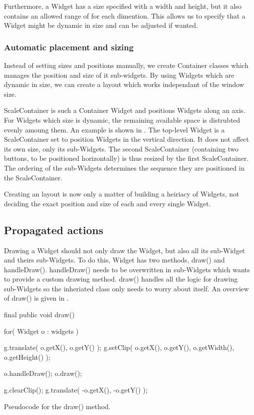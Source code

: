 Furthermore, a Widget has a size specified with a width and height, but it also contains an allowed range of for each dimention. This allows us to specify that a Widget might be dynamic in size and can be adjusted if wanted.


\subsubsection{Automatic placement and sizing}

Instead of setting sizes and positions manually, we create Container classes which manages the position and size of it sub-widgets. By using Widgets which are dynamic in size, we can create a layout which works independant of the window size.

ScaleContainer is such a Container Widget and positions Widgets along an axis. For Widgets which size is dynamic, the remaining available space is distrubted evenly amoung them. An example is shown in . The top-level Widget is a ScaleContainer set to position Widgets in the vertical direction. It does not affect its own size, only its sub-Widgets. The second ScaleContainer (containing two buttons, to be positioned horizontally) is thus resized by the first ScaleContainer. The ordering of the sub-Widgets determines the sequence they are positioned in the ScaleContainer.


Creating an layout is now only a matter of building a heiriacy of Widgets, not deciding the exact position and size of each and every single Widget.


\subsection{Propagated actions}

Drawing a Widget should not only draw the Widget, but also all its sub-Widget and theirs sub-Widgets. To do this, Widget has two methods, draw() and handleDraw(). handleDraw() needs to be overwritten in sub-Widgets which wants to provide a custom drawing method. draw() handles all the logic for drawing sub-Widgets so the inheriated class only needs to worry about itself. An overview of draw() is given in .

	final public void draw(){
		for( Widget o : widgets ){
			g.translate( o.getX(), o.getY() );
			g.setClip( o.getX(), o.getY(), o.getWidth(), o.getHeight() );
			
			o.handleDraw();
			o.draw();
			
			g.clearClip();
			g.translate( -o.getX(), -o.getY() );
		}
	}
	Pseudocode for the draw() method.

